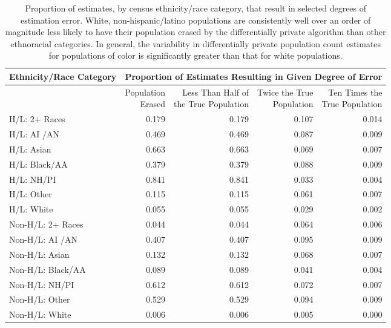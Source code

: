 \begin{table}[ht]
\centering
\begin{tabular}{l|rrrr} 
 Ethnicity/Race Category & \multicolumn{4}{c}{Proportion of Estimates Resulting in Given Degree of Error} \\
 \hline
 & \thead{Population \\ Erased} & \thead{Less Than Half of \\ the True Population} & \thead{Twice the True \\ Population} & \thead{Ten Times the \\ True Population} \\ 
  \hline
H/L: 2+ Races & 0.179 & 0.179 & 0.107 & 0.014 \\ 
H/L: AI /AN & 0.469 & 0.469 & 0.087 & 0.009 \\ 
  H/L: Asian & 0.663 & 0.663 & 0.069 & 0.007 \\ 
  H/L: Black/AA & 0.379 & 0.379 & 0.088 & 0.009 \\ 
  H/L: NH/PI & 0.841 & 0.841 & 0.033 & 0.004 \\ 
  H/L: Other & 0.115 & 0.115 & 0.061 & 0.007 \\ 
  H/L: White & 0.055 & 0.055 & 0.029 & 0.002 \\ 
   \hline
Non-H/L: 2+ Races & 0.044 & 0.044 & 0.064 & 0.006 \\ 
  Non-H/L: AI /AN & 0.407 & 0.407 & 0.095 & 0.009 \\ 
  Non-H/L: Asian & 0.132 & 0.132 & 0.068 & 0.007 \\ 
  Non-H/L: Black/AA & 0.089 & 0.089 & 0.041 & 0.004 \\ 
  Non-H/L: NH/PI & 0.612 & 0.612 & 0.072 & 0.007 \\ 
  Non-H/L: Other & 0.529 & 0.529 & 0.094 & 0.009 \\ 
  Non-H/L: White & 0.006 & 0.006 & 0.005 & 0.000 \\ 
  \end{tabular}
  \caption{Proportion of estimates, by census ethnicity/race category, that result in selected degrees of estimation error. White, non-hispanic/latino populations are consistently well over an order of magnitude less likely to have their population erased by the differentially private algorithm than other ethnoracial categories. In general, the variability in differentially private population count estimates for populations of color is significantly greater than that for white populations.}
  \label{tab:error-by}
\end{table}